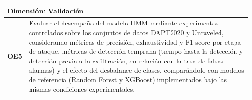 \begin{center}
    \vspace{0.2cm}

    \begin{tabularx}{\textwidth}{|c|X|}
    \hline
    \multicolumn{2}{|l|}{\textbf{Dimensión: Validación}} \\ \hline
    \textbf{OE5} & Evaluar el desempeño del modelo HMM mediante experimentos controlados sobre los conjuntos de datos DAPT2020 y Unraveled, considerando métricas de precisión, exhaustividad y F1-score por etapa de ataque, métricas de detección temprana (tiempo hasta la detección y detección previa a la exfiltración, en relación con la tasa de falsas alarmas) y el efecto del desbalance de clases, comparándolo con modelos de referencia (Random Forest y XGBoost) implementados bajo las mismas condiciones experimentales. \\ \hline
    \end{tabularx}
    \label{tab:obj_validacion}

\end{center}